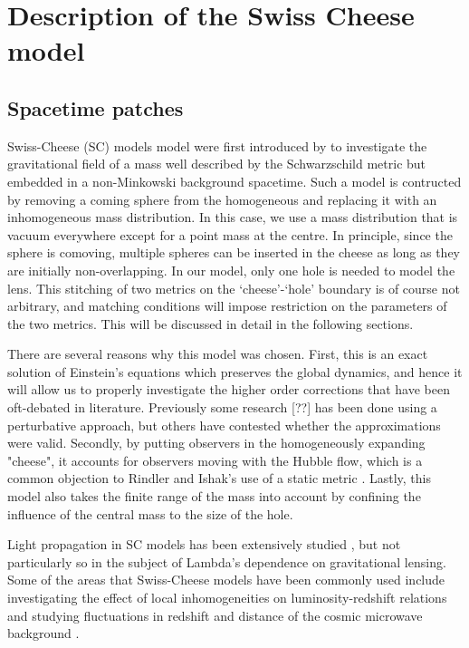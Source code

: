\chapter{Description of the Swiss Cheese model}
\label{chapter:swiss-cheese}

\section{Spacetime patches}

Swiss-Cheese (SC) models model were first introduced by \citet{einstein1945influence} to investigate the gravitational field of a mass well described by the Schwarzschild metric but embedded in a non-Minkowski background spacetime. Such a model is contructed by removing a coming sphere from the homogeneous and replacing it with an inhomogeneous mass distribution. In this case, we use a mass distribution that is vacuum everywhere except for a point mass at the centre. In principle, since the sphere is comoving, multiple spheres can be inserted in the cheese as long as they are initially non-overlapping. In our model, only one hole is needed to model the lens. This stitching of two metrics on the `cheese'-`hole' boundary is of course not arbitrary, and matching conditions will impose restriction on the parameters of the two metrics. This will be discussed in detail in the following sections. 

There are several reasons why this model was chosen. First, this is an exact solution of Einstein's equations which preserves the global dynamics, and hence it will allow us to properly investigate the higher order corrections that have been oft-debated in literature. Previously some research \citep{simpson2010lensing}[??] has been done using a perturbative approach, but others \citep{ishak2010more} have contested whether the approximations were valid. Secondly, by putting observers in the homogeneously expanding "cheese", it accounts for observers moving with the Hubble flow, which is a common objection to Rindler and Ishak's use of a static metric \citep{simpson2010lensing,butcher2016no,park2008rigorous,khriplovich2008does}. Lastly, this model also takes the finite range of the mass into account by confining the influence of the central mass to the size of the hole. 

Light propagation in SC models has been extensively studied \citep{szybka2011light,vanderveld2008luminosity,fleury2014swiss}, but not particularly so in the subject of Lambda's dependence on gravitational lensing. Some of the areas that Swiss-Cheese models have been commonly used include investigating the effect of local inhomogeneities on luminosity-redshift relations \citep{kantowski1969corrections,fleury2013interpretation} and studying fluctuations in redshift and distance of the cosmic microwave background \citep{bolejko2009szekeres,valkenburg2009swiss,bolejko2011effect}.


